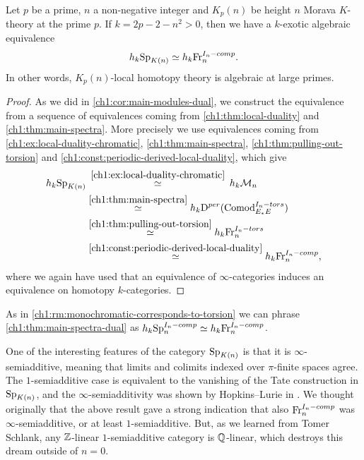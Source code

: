 \begin{theorem}
    \label{ch1:thm:main-spectra-dual}
    Let $p$ be a prime, $n$ a non-negative integer and $K_p(n)$ be height $n$ Morava $K$-theory at the prime $p$. If $k=2p-2-n^2>0$, then we have a $k$-exotic algebraic equivalence 
    $$h_k \mathrm{Sp}_{K(n)} \simeq h_k \mathrm{Fr}_{n}^{I_n-comp}.$$ 
    In other words, $K_p(n)$-local homotopy theory is algebraic at large primes. 
\end{theorem}
\begin{proof}
    As we did in \cref{ch1:cor:main-modules-dual}, we construct the equivalence from a sequence of equivalences coming from \cref{ch1:thm:local-duality} and \cref{ch1:thm:main-spectra}. More precisely we use equivalences coming from \cref{ch1:ex:local-duality-chromatic}, \cref{ch1:thm:main-spectra}, \cref{ch1:thm:pulling-out-torsion} and \cref{ch1:const:periodic-derived-local-duality}, which give
    \begin{align*}
        h_k \mathrm{Sp}_{K(n)}
        &\overset{\hspace{2pt}\ref{ch1:ex:local-duality-chromatic}\hspace{2pt}}
        \simeq 
        h_k \mathcal{M}_{n} \\
        &\overset{\ref{ch1:thm:main-spectra}}
        \simeq 
        h_k \mathrm{D}^{per}(\mathrm{Comod}_{E_*E}^{I_n-tors}) \\
        &\overset{\ref{ch1:thm:pulling-out-torsion}}
        \simeq 
        h_k \mathrm{Fr}_{n}^{I_n-tors} \\
        &\overset{\ref{ch1:const:periodic-derived-local-duality}}
        \simeq 
        h_k \mathrm{Fr}_{n}^{I_n-comp},
    \end{align*}
    where we again have used that an equivalence of $\infty$-categories induces an equivalence on homotopy $k$-categories.
\end{proof}

\begin{remark}
    As in \cref{ch1:rm:monochromatic-corresponds-to-torsion} we can phrase \cref{ch1:thm:main-spectra-dual} as $h_k\mathrm{Sp}_{n}^{I_n-comp}\simeq h_k\mathrm{Fr}_{n}^{I_n-comp}$. 
\end{remark}

\begin{addendum}
    One of the interesting features of the category $\mathrm{Sp}_{K(n)}$ is that it is $\infty$-semiadditive, meaning that limits and colimits indexed over $\pi$-finite spaces agree. The $1$-semiadditive case is equivalent to the vanishing of the Tate construction in $\mathrm{Sp}_{K(n)}$, and the $\infty$-semiadditivity was shown by Hopkins--Lurie in \cite{hopkins-lurie_17}. We thought originally that the above result gave a strong indication that also $\mathrm{Fr}_{n}^{I_n-comp}$ was $\infty$-semiadditive, or at least $1$-semiadditive. But, as we learned from Tomer Schlank, any $\mathbb{Z}$-linear $1$-semiadditive category is $\mathbb{Q}$-linear, which destroys this dream outside of $n=0$. 
\end{addendum}






